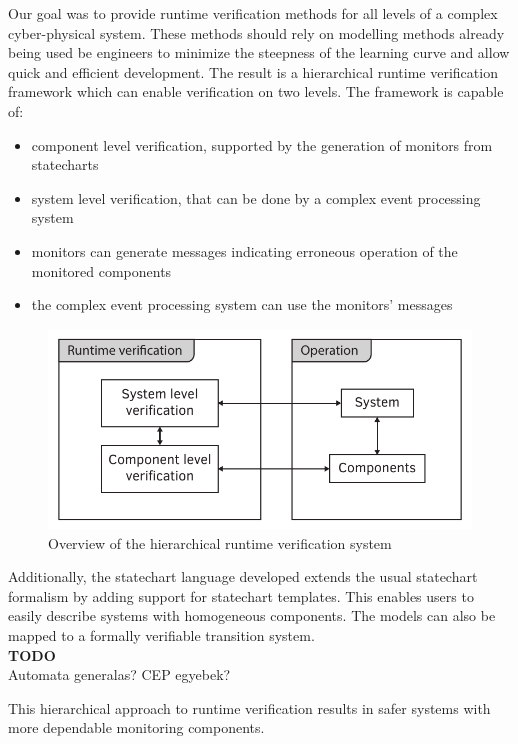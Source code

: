 Our goal was to provide runtime verification methods for all levels of a complex cyber-physical system. These methods should rely on modelling methods already being used be engineers to minimize the steepness of the learning curve and allow quick and efficient development. The result is a hierarchical runtime verification framework which can enable verification on two levels. The framework is capable of:
\begin{itemize}
  \item component level verification, supported by the generation of monitors from statecharts
  \item system level verification, that can be done by a complex event processing system
  \item monitors can generate messages indicating erroneous operation of the monitored components
  \item the complex event processing system can use the monitors' messages
\end{itemize}
\begin{figure}[h]
	\centering
	\includegraphics[width=0.5\linewidth]{include/figures/chapter_1/rv_overview}
	\caption{Overview of the hierarchical runtime verification system}
	\label{fig:case_study:fov}
\end{figure}
Additionally, the statechart language developed extends the usual statechart formalism by adding support for statechart templates. This enables users to easily describe systems with homogeneous components. The models can also be mapped to a formally verifiable transition system.
\\\textbf{TODO}\\
Automata generalas?
CEP egyebek?

This hierarchical approach to runtime verification results in safer systems with more dependable monitoring components.
